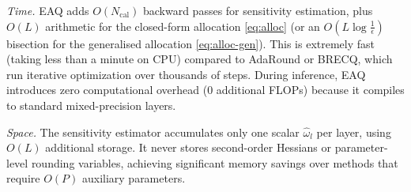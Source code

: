 \begin{remark}
\emph{Time.} EAQ adds $O(N_{\mathrm{cal}})$ backward passes for sensitivity estimation, plus $O(L)$ arithmetic for the closed-form allocation \eqref{eq:alloc} (or an $O(L\log\frac1\epsilon)$ bisection for the generalised allocation \eqref{eq:alloc-gen}). This is extremely fast (taking less than a minute on CPU) compared to AdaRound or BRECQ, which run iterative optimization over thousands of steps. During inference, EAQ introduces zero computational overhead (0 additional FLOPs) because it compiles to standard mixed-precision layers.

\emph{Space.} The sensitivity estimator accumulates only one scalar $\hat\omega_l$ per layer, using $O(L)$ additional storage. It never stores second-order Hessians or parameter-level rounding variables, achieving significant memory savings over methods that require $O(P)$ auxiliary parameters.
\end{remark}
